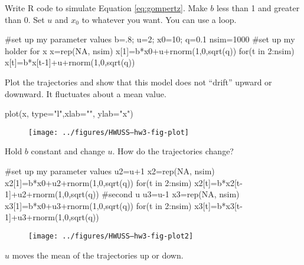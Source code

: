 \begin{wideenumerate}
\item Write R code to simulate Equation \ref{eq:gompertz}.  Make $b$ less than 1 and greater than 0.  Set $u$ and $x_0$ to whatever you want.  You can use a \verb@for@ loop. 
\begin{Schunk}
\begin{Sinput}
 #set up my parameter values
 b=.8; u=2; x0=10; q=0.1
 nsim=1000
 #set up my holder for x
 x=rep(NA, nsim)
 x[1]=b*x0+u+rnorm(1,0,sqrt(q))
 for(t in 2:nsim) x[t]=b*x[t-1]+u+rnorm(1,0,sqrt(q))
\end{Sinput}
\end{Schunk}

\item Plot the trajectories and show that this model does not ``drift'' upward or downward.  It fluctuates about a mean value.
\begin{Schunk}
\begin{Sinput}
 plot(x, type="l",xlab="", ylab="x")
\end{Sinput}
\end{Schunk}
\begin{figure}[htp]
\begin{center}
\texttt{[image: ../figures/HWUSS--hw3-fig-plot]}
\end{center}
\end{figure}

\item Hold $b$ constant and change $u$.  How do the trajectories change?
\begin{Schunk}
\begin{Sinput}
 #set up my parameter values
 u2=u+1
 x2=rep(NA, nsim)
 x2[1]=b*x0+u2+rnorm(1,0,sqrt(q))
 for(t in 2:nsim) x2[t]=b*x2[t-1]+u2+rnorm(1,0,sqrt(q))
 #second u
 u3=u-1
 x3=rep(NA, nsim)
 x3[1]=b*x0+u3+rnorm(1,0,sqrt(q))
 for(t in 2:nsim) x3[t]=b*x3[t-1]+u3+rnorm(1,0,sqrt(q))
 
\end{Sinput}
\end{Schunk}
\begin{figure}[htp]
\begin{center}
\texttt{[image: ../figures/HWUSS--hw3-fig-plot2]}
\end{center}
\end{figure}
$u$ moves the mean of the trajectories up or down.



\end{wideenumerate}
